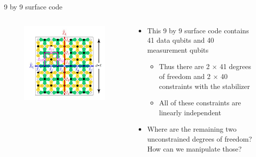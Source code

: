 \documentclass{beamer}
\begin{document}
    \begin{frame}{9 by 9 surface code}
        \begin{minipage}[0.65\textheight]{\textwidth}
        \begin{columns}[T]
            \begin{column}{0.4\textwidth}
                \begin{figure}[t]
                    \centering
                    \includegraphics[height=0.6\textheight]{./Images/surf-code-logical.jpg}
                \end{figure}
            \end{column}
            \begin{column}{0.6\textwidth}
                \begin{itemize}
                \item This 9 by 9 surface code contains 41 data qubits and 40 measurement qubits
                \begin{itemize}
                    \item Thus there are 2 $ \times $ 41 degrees of   freedom and 2 $ \times $ 40 constraints with the stabilizer
                    \item All of these constraints are linearly independent
                \end{itemize}
                \item Where are the remaining two unconstrained degrees of freedom? How can we manipulate those?
                \end{itemize}
            \end{column}
        \end{columns}
        \end{minipage}
    \end{frame}
    
\end{document}
